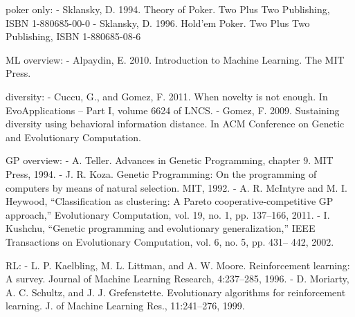 poker only:
- Sklansky, D. 1994. Theory of Poker. Two Plus Two Publishing, ISBN 1-880685-00-0
- Sklansky, D. 1996. Hold'em Poker. Two Plus Two Publishing, ISBN 1-880685-08-6

ML overview:
- Alpaydin, E. 2010. Introduction to Machine Learning. The
MIT Press.

diversity:
- Cuccu, G., and Gomez, F. 2011. When novelty is not
enough. In EvoApplications – Part I, volume 6624 of LNCS.
- Gomez, F. 2009. Sustaining diversity using behavioral information
distance. In ACM Conference on Genetic and Evolutionary
Computation.

GP overview:
- A. Teller. Advances in Genetic Programming,
chapter 9. MIT Press, 1994.
- J. R. Koza. Genetic Programming: On the programming of computers by
means of natural selection. MIT, 1992.
- A. R. McIntyre and M. I. Heywood, “Classification as clustering: A
Pareto cooperative-competitive GP approach,” Evolutionary Computation,
vol. 19, no. 1, pp. 137–166, 2011.
- I. Kushchu, “Genetic programming and evolutionary generalization,”
IEEE Transactions on Evolutionary Computation, vol. 6, no. 5, pp. 431–
442, 2002.

RL:
- L. P. Kaelbling, M. L. Littman, and A. W. Moore.
Reinforcement learning: A survey. Journal of Machine
Learning Research, 4:237–285, 1996.
- D. Moriarty, A. C. Schultz, and J. J. Grefenstette.
Evolutionary algorithms for reinforcement learning. J.
of Machine Learning Res., 11:241–276, 1999.

